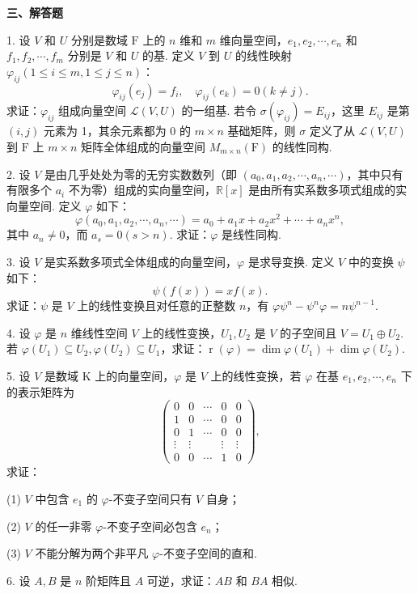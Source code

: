 \documentclass[UTF8,12pt,a4paper,fontset=fandol]{ctexart}
\begin{document}
\noindent\textbf{三、解答题}

1. 设 $V$ 和 $U$ 分别是数域 $\mathrm{F}$ 上的 $n$ 维和 $m$ 维向量空间，$e_1,e_2,\cdots,e_n$ 和 $f_1,f_2,\cdots,f_m$ 分别是 $V$ 和 $U$ 的基. 定义 $V$ 到 $U$ 的线性映射 $\varphi_{ij}(1\le i\le m,1\le j\le n)$：
\[
\varphi_{ij}(e_j)=f_i,\quad \varphi_{ij}(e_k)=0(k\ne j).
\]
求证：$\varphi_{ij}$ 组成向量空间 $\mathcal{L}(V,U)$ 的一组基. 若令 $\sigma(\varphi_{ij})=E_{ij}$，这里 $E_{ij}$ 是第 $(i,j)$ 元素为 1，其余元素都为 0 的 $m\times n$ 基础矩阵，则 $\sigma$ 定义了从 $\mathcal{L}(V,U)$ 到 $\mathrm{F}$ 上 $m\times n$ 矩阵全体组成的向量空间 $M_{m\times n}(\mathrm{F})$ 的线性同构.

2. 设 $V$ 是由几乎处处为零的无穷实数数列（即 $(a_0,a_1,a_2,\cdots,a_n,\cdots)$，其中只有有限多个 $a_i$ 不为零）组成的实向量空间，$\mathbb{R}[x]$ 是由所有实系数多项式组成的实向量空间. 定义 $\varphi$ 如下：
\[
\varphi(a_0,a_1,a_2,\cdots,a_n,\cdots)=a_0+a_1x+a_2x^2+\cdots+a_nx^n,
\]
其中 $a_n\ne0$，而 $a_s=0(s>n)$. 求证：$\varphi$ 是线性同构.

3. 设 $V$ 是实系数多项式全体组成的向量空间，$\varphi$ 是求导变换. 定义 $V$ 中的变换 $\psi$ 如下：
\[
\psi(f(x))=xf(x).
\]
求证：$\psi$ 是 $V$ 上的线性变换且对任意的正整数 $n$，有 $\varphi\psi^n-\psi^n\varphi=n\psi^{n-1}$.

4. 设 $\varphi$ 是 $n$ 维线性空间 $V$ 上的线性变换，$U_1,U_2$ 是 $V$ 的子空间且 $V=U_1\oplus U_2$. 若 $\varphi(U_1)\subseteq U_2,\varphi(U_2)\subseteq U_1$，求证：$\operatorname{r}(\varphi)=\dim\varphi(U_1)+\dim\varphi(U_2)$.

5. 设 $V$ 是数域 $\mathrm{K}$ 上的向量空间，$\varphi$ 是 $V$ 上的线性变换，若 $\varphi$ 在基 $e_1,e_2,\cdots,e_n$ 下的表示矩阵为
\[
\left(\begin{array}{ccccc}
0 & 0 & \cdots & 0 & 0\\
1 & 0 & \cdots & 0 & 0\\
0 & 1 & \cdots & 0 & 0\\
\vdots & \vdots &        & \vdots & \vdots\\
0 & 0 & \cdots & 1 & 0
\end{array}\right),
\]
求证：

(1) $V$ 中包含 $e_1$ 的 $\varphi$-不变子空间只有 $V$ 自身；

(2) $V$ 的任一非零 $\varphi$-不变子空间必包含 $e_n$；

(3) $V$ 不能分解为两个非平凡 $\varphi$-不变子空间的直和.

6. 设 $A,B$ 是 $n$ 阶矩阵且 $A$ 可逆，求证：$AB$ 和 $BA$ 相似.
\end{document}
